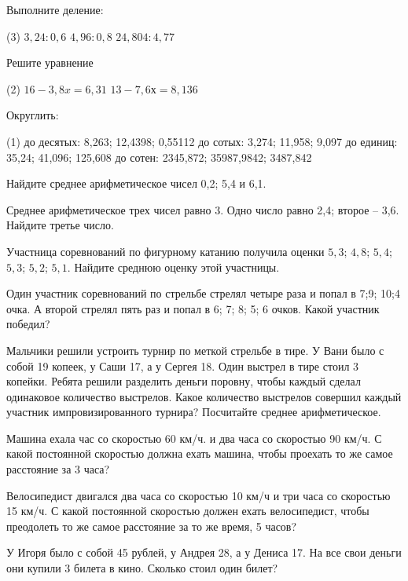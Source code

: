 %
%

\begin{class}[number=1]
	\begin{listofex}
		\item Выполните деление:\begin{tasks}(3)
			\task \( 3,24:0,6 \)
			\task \( 4,96 : 0,8 \)
			\task \( 24,804 : 4,77 \)
		\end{tasks}
		\item Решите уравнение \begin{tasks}(2)
			\task \( 16-3,8x = 6,31 \)
			\task \( 13 -7,6х = 8,136 \)
		\end{tasks} 
		\item Округлить:
		\begin{tasks}(1)
			\task до десятых: 8,263;   12,4398;    0,55112
			\task до сотых: 3,274;   11,958;   9,097
			\task до единиц: 35,24;   41,096;   125,608
			\task до сотен: 2345,872;   35987,9842;   3487,842
		\end{tasks} 
		\item Найдите среднее арифметическое чисел 0,2; 5,4 и 6,1.
		\item Среднее арифметическое трех чисел равно 3. Одно число равно 2,4; второе – 3,6. Найдите третье число.
		\item Участница соревнований по фигурному катанию получила оценки \( 5,3 \); \( 4,8 \); \( 5,4 \); \(  5,3 \);  \( 5,2 \); \(  5,1 \). Найдите среднюю оценку этой участницы.                                                                                                                                            
		\item Один участник соревнований по стрельбе стрелял четыре раза и попал в 7;9; 10;4 очка. А второй стрелял пять раз и попал в 6; 7; 8; 5; 6 очков. Какой участник победил?    
		\item Мальчики решили устроить турнир по меткой стрельбе в тире. У Вани было с собой 19 копеек, у Саши 17, а у Сергея 18. Один выстрел в тире стоил 3 копейки. Ребята решили разделить деньги поровну, чтобы каждый сделал одинаковое количество выстрелов. Какое количество выстрелов совершил каждый участник импровизированного турнира? Посчитайте среднее арифметическое.
		\item Машина ехала час со скоростью 60 км/ч. и два часа со скоростью 90 км/ч. С какой постоянной скоростью должна ехать машина, чтобы проехать то же самое расстояние за 3 часа? 
		\item Велосипедист двигался два часа со скоростью   10 км/ч  и три часа со скоростью   15 км/ч.   С какой постоянной скоростью должен  ехать велосипедист, чтобы преодолеть то же самое расстояние за то же  время, 5 часов?    
		\item У Игоря было с собой   45 рублей, у Андрея   28, а у Дениса   17. На все свои деньги они купили 3 билета в кино. Сколько стоил один билет?  
		
	\end{listofex}
\end{class}

